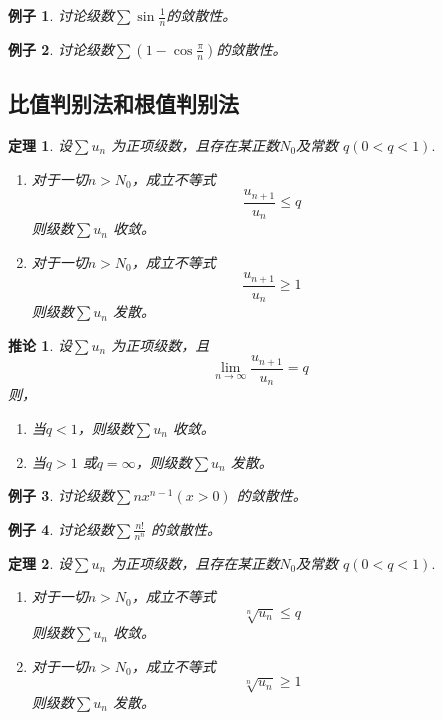 \documentclass[a4paper,12pt]{article}
\newtheorem{theorem}{定理}
\newtheorem{example}{例子}
\newtheorem{corollary}{推论}
\begin{document}
\begin{example}
    讨论级数$\displaystyle \sum \sin \frac{1}{n}$的敛散性。
\end{example}

\begin{example}
    讨论级数$\displaystyle \sum \left(1 - \cos \frac{\pi}{n}\right)$的敛散性。
\end{example}

\subsection{比值判别法和根值判别法}
\begin{theorem}
    设$\displaystyle \sum u_n$ 为正项级数，且存在某正数$N_0$及常数
    $q (0 < q < 1).$ 
    \begin{enumerate}[label={\rm(\arabic*)}]
        \item  对于一切$n > N_0$，成立不等式
            \[
                \frac{u_{n+1}}{u_n} \le q
                \]
        则级数$\displaystyle \sum u_n$ 收敛。
        \item  对于一切$n > N_0$，成立不等式
            \[
                \frac{u_{n+1}}{u_n} \ge 1
                \]
        则级数$\displaystyle \sum u_n$ 发散。
    \end{enumerate}
\end{theorem}

\begin{corollary}
    设$\displaystyle \sum u_n$ 为正项级数，且
    \[
        \lim_{n \to \infty} \frac{u_{n+1}}{u_n} = q
        \]
    则，
    \begin{enumerate}[label={\rm(\arabic*)}]
        \item  当$q < 1$，则级数$\displaystyle \sum u_n$ 收敛。
        \item  当$q > 1$ 或$q = \infty$，则级数$\displaystyle \sum u_n$ 发散。
    \end{enumerate}
\end{corollary}

\begin{example}
    讨论级数$\displaystyle \sum nx^{n-1}(x>0)$ 的敛散性。
\end{example}

\begin{example}
    讨论级数$\displaystyle \sum \frac{n!}{n^n}$ 的敛散性。
\end{example}

\begin{theorem}
    设$\displaystyle \sum u_n$ 为正项级数，且存在某正数$N_0$及常数
    $q (0 < q < 1).$ 
    \begin{enumerate}[label={\rm(\arabic*)}]
        \item  对于一切$n > N_0$，成立不等式
            \[
                \sqrt[n]{u_n} \le q
                \]
        则级数$\displaystyle \sum u_n$ 收敛。
        \item  对于一切$n > N_0$，成立不等式
            \[
                \sqrt[n]{u_n} \ge 1
                \]
        则级数$\displaystyle \sum u_n$ 发散。
    \end{enumerate}
\end{theorem}
\end{document}
